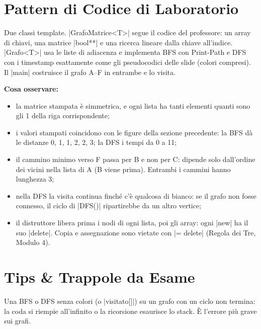 \section{Pattern di Codice di Laboratorio}

Due classi template. \cc|GrafoMatrice<T>| segue il codice del professore: un array di
chiavi, una matrice \cc|bool**| e una ricerca lineare dalla chiave all'indice.
\cc|Grafo<T>| usa le liste di adiacenza e implementa BFS con Print-Path e DFS con i
timestamp esattamente come gli pseudocodici delle slide (colori compresi). Il \cc|main|
costruisce il grafo A--F in entrambe e lo visita.


\textbf{Cosa osservare:}
\begin{itemize}
  \item la matrice stampata è simmetrica, e ogni lista ha tanti elementi quanti sono gli 1
        della riga corrispondente;
  \item i valori stampati coincidono con le figure della sezione precedente: la BFS dà le
        distanze 0, 1, 1, 2, 2, 3; la DFS i tempi da 0 a 11;
  \item il cammino minimo verso F passa per B e non per C: dipende solo dall'ordine dei
        vicini nella lista di A (B viene prima). Entrambi i cammini hanno lunghezza 3;
  \item nella DFS la visita continua finché c'è qualcosa di bianco: se il grafo non fosse
        connesso, il ciclo di \cc|DFS()| ripartirebbe da un altro vertice;
  \item il distruttore libera prima i nodi di ogni lista, poi gli array: ogni \cc|new| ha
        il suo \cc|delete|. Copia e assegnazione sono vietate con \cc|= delete| (Regola dei
        Tre, Modulo 4).
\end{itemize}

\section{Tips \& Trappole da Esame}

\begin{trappola}
Una BFS o DFS senza colori (o \cc|visitato[]|) su un grafo con un ciclo non termina: la
coda si riempie all'infinito o la ricorsione esaurisce lo stack. È l'errore più grave
sui grafi.
\end{trappola}

